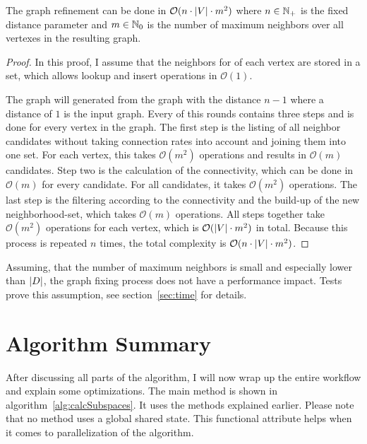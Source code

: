 \begin{envtheo}\label{theo:fixing}
	The graph refinement can be done in $\mathcal{O} ( n \cdot \left|V\right| \cdot m^2 )$ where $n \in \mathbb{N}_+$ is the fixed distance parameter and $m \in \mathbb{N}_0$ is the number of maximum neighbors over all vertexes in the resulting graph.
\end{envtheo}
\begin{proof}
	In this proof, I assume that the neighbors for of each vertex are stored in a set, which allows lookup and insert operations in $\mathcal{O} (1)$.

	The graph will generated from the graph with the distance $n-1$ where a distance of $1$ is the input graph. Every of this rounds contains three steps and is done for every vertex in the graph. The first step is the listing of all neighbor candidates without taking connection rates into account and joining them into one set. For each vertex, this takes $\mathcal{O} ( m^2 )$ operations and results in $\mathcal{O} ( m )$ candidates. Step two is the calculation of the connectivity, which can be done in $\mathcal{O} ( m )$ for every candidate. For all candidates, it takes $\mathcal{O} ( m^2 )$ operations. The last step is the filtering according to the connectivity and the build-up of the new neighborhood-set, which takes $\mathcal{O} ( m )$ operations. All steps together take $\mathcal{O} ( m^2 )$ operations for each vertex, which is $\mathcal{O} ( \left|V\right| \cdot m^2)$ in total. Because this process is repeated $n$ times, the total complexity is $\mathcal{O} ( n \cdot \left|V\right| \cdot m^2 )$.
\end{proof}

Assuming, that the number of maximum neighbors is small and especially lower than $\left|D\right|$, the graph fixing process does not have a performance impact. Tests prove this assumption, see section~\ref{sec:time} for details.

\section{Algorithm Summary}
After discussing all parts of the algorithm, I will now wrap up the entire workflow and explain some optimizations. The main method is shown in algorithm~\ref{alg:calcSubspaces}. It uses the methods explained earlier. Please note that no method uses a global shared state. This functional attribute helps when it comes to parallelization of the algorithm.

